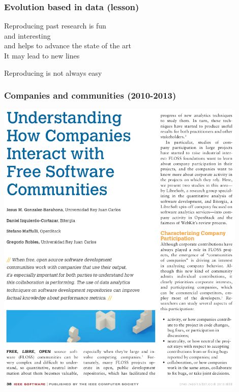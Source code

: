 \documentclass[17pt,aspectratio=169,hyperref=pdfusetitle]{beamer}
\begin{document}
\begin{frame}[fragile]
  \frametitle{Evolution based in data (lesson)}

  Reproducing past research is fun \\
  and interesting \\
  and helps to advance the state of the art \\
  It may lead to new lines \\
  
  \begin{center}
    Reproducing is not always easy
  \end{center}  
  
\end{frame}

\begin{frame}[fragile]
  \frametitle{Companies and communities (2010-2013)}

  \begin{center}
  \includegraphics[width=12cm]{figs/software-companies}
  \end{center}  
  
\end{frame}
\end{document}

